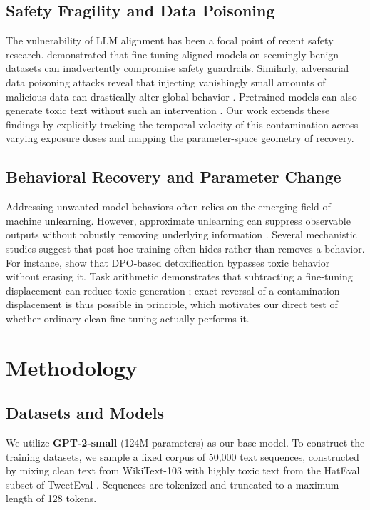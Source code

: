 \documentclass[11pt,a4paper]{article}
\begin{document}
\subsection{Safety Fragility and Data Poisoning}
The vulnerability of LLM alignment has been a focal point of recent safety research. \citet{qi2023fine} demonstrated that fine-tuning aligned models on seemingly benign datasets can inadvertently compromise safety guardrails. Similarly, adversarial data poisoning attacks reveal that injecting vanishingly small amounts of malicious data can drastically alter global behavior \citep{fu2025poisonbench}. Pretrained models can also generate toxic text without such an intervention \citep{gehman2020realtoxicityprompts}. Our work extends these findings by explicitly tracking the temporal velocity of this contamination across varying exposure doses and mapping the parameter-space geometry of recovery.

\subsection{Behavioral Recovery and Parameter Change}
Addressing unwanted model behaviors often relies on the emerging field of machine unlearning. However, approximate unlearning can suppress observable outputs without robustly removing underlying information \citep{hu2024unlearning}. Several mechanistic studies suggest that post-hoc training often hides rather than removes a behavior. For instance, \citet{lee2024mechanistic} show that DPO-based detoxification bypasses toxic behavior without erasing it. Task arithmetic demonstrates that subtracting a fine-tuning displacement can reduce toxic generation \citep{ilharco2023task}; exact reversal of a contamination displacement is thus possible in principle, which motivates our direct test of whether ordinary clean fine-tuning actually performs it.

\section{Methodology}
\subsection{Datasets and Models}
We utilize \textbf{GPT-2-small} (124M parameters) as our base model. To construct the training datasets, we sample a fixed corpus of 50,000 text sequences, constructed by mixing clean text from WikiText-103 \citep{merity2017pointer} with highly toxic text from the HatEval \citep{basile2019hateval} subset of TweetEval \citep{barbieri2020tweeteval}. Sequences are tokenized and truncated to a maximum length of 128 tokens.
\end{document}
